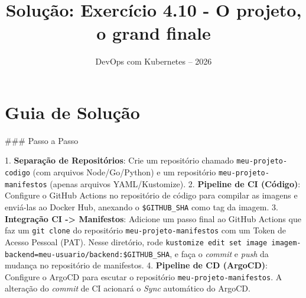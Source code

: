 \documentclass[11pt,a4paper]{article}
\title{\color{secondary}\Huge\textbf{Solução: Exercício 4.10 - O projeto, o grand finale}}
\author{\color{primary}DevOps com Kubernetes -- 2026}
\date{}
\begin{document}
\maketitle

\section*{\color{primary}Guia de Solução}
\begin{tcolorbox}[colback=green!5!white,colframe=green!60!black,title=Resolução Passo a Passo]
### Passo a Passo

1. \textbf{Separação de Repositórios}: Crie um repositório chamado \texttt{meu-projeto-codigo} (com arquivos Node/Go/Python) e um repositório \texttt{meu-projeto-manifestos} (apenas arquivos YAML/Kustomize).
2. \textbf{Pipeline de CI (Código)}: Configure o GitHub Actions no repositório de código para compilar as imagens e enviá-las ao Docker Hub, anexando o \texttt{\$GITHUB_SHA} como tag da imagem.
3. \textbf{Integração CI -> Manifestos}: Adicione um passo final ao GitHub Actions que faz um \texttt{git clone} do repositório \texttt{meu-projeto-manifestos} com um Token de Acesso Pessoal (PAT). Nesse diretório, rode \texttt{kustomize edit set image imagem-backend=meu-usuario/backend:\$GITHUB_SHA}, e faça o \textit{commit} e \textit{push} da mudança no repositório de manifestos.
4. \textbf{Pipeline de CD (ArgoCD)}: Configure o ArgoCD para escutar o repositório \texttt{meu-projeto-manifestos}. A alteração do \textit{commit} de CI acionará o \textit{Sync} automático do ArgoCD.
\end{tcolorbox}
\end{document}
